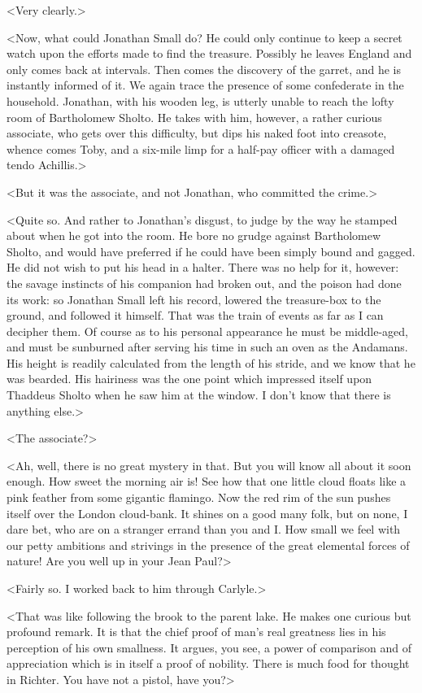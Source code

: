 <Very clearly.>

<Now, what could Jonathan Small do? He could only continue to keep a secret watch upon the efforts made to find the treasure. Possibly he leaves England and only comes back at intervals. Then comes the discovery of the garret, and he is instantly informed of it. We again trace the presence of some confederate in the household. Jonathan, with his wooden leg, is utterly unable to reach the lofty room of Bartholomew Sholto. He takes with him, however, a rather curious associate, who gets over this difficulty, but dips his naked foot into creasote, whence comes Toby, and a six-mile limp for a half-pay officer with a damaged tendo Achillis.>

<But it was the associate, and not Jonathan, who committed the crime.>

<Quite so. And rather to Jonathan's disgust, to judge by the way he stamped about when he got into the room. He bore no grudge against Bartholomew Sholto, and would have preferred if he could have been simply bound and gagged. He did not wish to put his head in a halter. There was no help for it, however: the savage instincts of his companion had broken out, and the poison had done its work: so Jonathan Small left his record, lowered the treasure-box to the ground, and followed it himself. That was the train of events as far as I can decipher them. Of course as to his personal appearance he must be middle-aged, and must be sunburned after serving his time in such an oven as the Andamans. His height is readily calculated from the length of his stride, and we know that he was bearded. His hairiness was the one point which impressed itself upon Thaddeus Sholto when he saw him at the window. I don't know that there is anything else.>

<The associate?>

<Ah, well, there is no great mystery in that. But you will know all about it soon enough. How sweet the morning air is! See how that one little cloud floats like a pink feather from some gigantic flamingo. Now the red rim of the sun pushes itself over the London cloud-bank. It shines on a good many folk, but on none, I dare bet, who are on a stranger errand than you and I\@. How small we feel with our petty ambitions and strivings in the presence of the great elemental forces of nature! Are you well up in your Jean Paul?>

<Fairly so. I worked back to him through Carlyle.>

<That was like following the brook to the parent lake. He makes one curious but profound remark. It is that the chief proof of man's real greatness lies in his perception of his own smallness. It argues, you see, a power of comparison and of appreciation which is in itself a proof of nobility. There is much food for thought in Richter. You have not a pistol, have you?>

